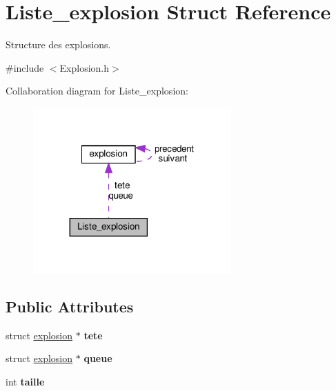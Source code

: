 \hypertarget{struct_liste__explosion}{}\section{Liste\+\_\+explosion Struct Reference}
\label{struct_liste__explosion}


Structure des explosions.  




{\ttfamily \#include $<$Explosion.\+h$>$}



Collaboration diagram for Liste\+\_\+explosion\+:
\nopagebreak
\begin{figure}[H]
\begin{center}
\leavevmode
\includegraphics[width=215pt]{struct_liste__explosion__coll__graph}
\end{center}
\end{figure}
\subsection*{Public Attributes}
\begin{DoxyCompactItemize}
\item 
\mbox{\label{struct_liste__explosion_a300ddd39773ced0fcda3120b712a7dd6}} 
struct \hyperlink{structexplosion}{explosion} $\ast$ {\bfseries tete}
\item 
\mbox{\label{struct_liste__explosion_a3e5c2023d6d63a50640f75f0f2a9d6d9}} 
struct \hyperlink{structexplosion}{explosion} $\ast$ {\bfseries queue}
\item 
\mbox{\label{struct_liste__explosion_a7cd42e23f9f2dd53eb3e509e9258bfc4}} 
int {\bfseries taille}
\end{DoxyCompactItemize}


